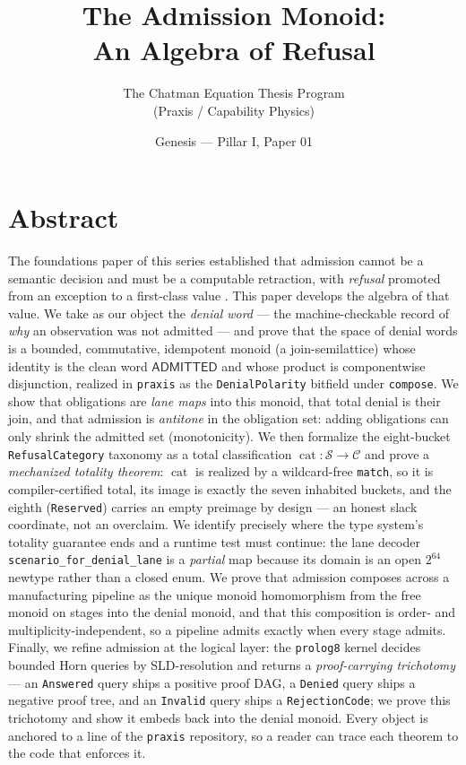 \documentclass[11pt,oneside]{book}
\title{\bfseries The Admission Monoid:\\[0.4em]
\large An Algebra of Refusal}
\author{The Chatman Equation Thesis Program \\ (Praxis / Capability Physics)}
\date{Genesis --- Pillar I, Paper 01}
\theoremstyle{definition}
\theoremstyle{plain}
\theoremstyle{remark}
\newcommand{\code}[1]{\texttt{#1}}
\newcommand{\Adml}{\mathsf{ADMITTED}}          %
\newcommand{\Catset}{\mathcal{C}}              %
\newcommand{\Scnset}{\mathcal{S}}              %
\DeclareMathOperator{\catop}{cat}
\begin{document}
\frontmatter
\maketitle

\chapter*{Abstract}
The foundations paper of this series established that admission cannot be a semantic
decision and must be a computable retraction, with \emph{refusal} promoted from an exception
to a first-class value \cite{chatman2025}. This paper develops the algebra of that value. We
take as our object the \emph{denial word} --- the machine-checkable record of \emph{why} an
observation was not admitted --- and prove that the space of denial words is a bounded,
commutative, idempotent monoid (a join-semilattice) whose identity is the clean word
$\Adml$ and whose product is componentwise disjunction, realized in \code{praxis} as the
\code{DenialPolarity} bitfield under \code{compose}. We show that obligations are
\emph{lane maps} into this monoid, that total denial is their join, and that admission is
\emph{antitone} in the obligation set: adding obligations can only shrink the admitted set
(monotonicity). We then formalize the eight-bucket \code{RefusalCategory} taxonomy as a
total classification $\catop:\Scnset\to\Catset$ and prove a \emph{mechanized totality
theorem}: $\catop$ is realized by a wildcard-free \code{match}, so it is compiler-certified
total, its image is exactly the seven inhabited buckets, and the eighth (\code{Reserved})
carries an empty preimage by design --- an honest slack coordinate, not an overclaim. We
identify precisely where the type system's totality guarantee ends and a runtime test must
continue: the lane decoder \code{scenario\_for\_denial\_lane} is a \emph{partial} map because
its domain is an open $2^{64}$ newtype rather than a closed enum. We prove that admission
composes across a manufacturing pipeline as the unique monoid homomorphism from the free
monoid on stages into the denial monoid, and that this composition is order- and
multiplicity-independent, so a pipeline admits exactly when every stage admits. Finally, we
refine admission at the logical layer: the \code{prolog8} kernel decides bounded Horn queries
by SLD-resolution and returns a \emph{proof-carrying trichotomy} --- an \code{Answered} query
ships a positive proof DAG, a \code{Denied} query ships a negative proof tree, and an
\code{Invalid} query ships a \code{RejectionCode}; we prove this trichotomy and show it embeds
back into the denial monoid. Every object is anchored to a line of the \code{praxis}
repository, so a reader can trace each theorem to the code that enforces it.
\end{document}
